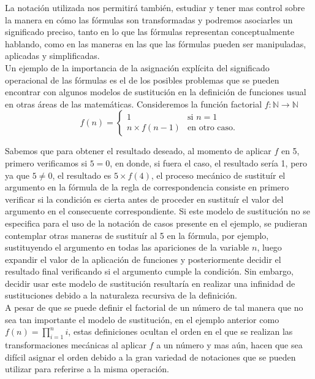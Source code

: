 La notación utilizada nos permitirá también, estudiar y tener mas control sobre
la manera en cómo las fórmulas son transformadas y podremos asociarles un
significado preciso, tanto en lo que las fórmulas representan conceptualmente
hablando, como en las maneras en las que las fórmulas pueden ser manipuladas,
aplicadas y simplificadas.\\

Un ejemplo de la importancia de la asignación explícita del significado
operacional de las fórmulas es el de los posibles problemas que se pueden
encontrar con algunos modelos de sustitución en la definición de funciones usual
en otras áreas de las matemáticas. Consideremos la función factorial \(f : \mathbb{N}
\to \mathbb{N}\)
\[f(n)=
\begin{cases}
  1 &\mbox{si } n=1\\
  n\times f(n-1) & \mbox{en otro caso.}
\end{cases}
\]

Sabemos que para obtener el resultado deseado, al momento de aplicar \(f\) en 5,
primero verificamos si \(5=0\), en donde, si fuera el caso, el resultado sería 1,
pero ya que \(5\not= 0\), el resultado es \(5\times f(4)\), el proceso mecánico
de sustituír el argumento en la fórmula de la regla de correspondencia consiste
en primero verificar si la condición es cierta antes de proceder en sustituír el
valor del argumento en el consecuente correspondiente. Si este modelo de
sustitución no se especifica para el uso de la notación de casos presente en el
ejemplo, se pudieran contemplar otras maneras de sustituír al 5 en la fórmula,
por ejemplo, sustituyendo el argumento en todas las apariciones de la variable
\(n\), luego expandir el valor de la aplicación de funciones y posteriormente
decidir el resultado final verificando si el argumento cumple la condición. Sin
embargo, decidir usar este modelo de sustitución resultaría en realizar una
infinidad de sustituciones debido a la naturaleza recursiva de la definición.\\

A pesar de que se puede definir el factorial de un número de tal manera que no
sea tan importante el modelo de sustitución, en el ejemplo anterior como
\(f(n)=\prod_{i=1}^{n} i\), estas definiciones ocultan el orden en el que se
realizan las transformaciones mecánicas al aplicar \(f\) a un número y mas aún,
hacen que sea difícil asignar el orden debido a la gran variedad de notaciones
que se pueden utilizar para referirse a la misma operación.\\

